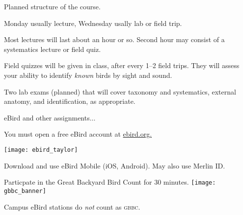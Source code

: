 \documentclass[t]{beamer}
\begin{document}
\begin{frame}[t]{Planned structure of the course.}

\vspace{-\baselineskip}

\hangpara Monday usually lecture, Wednesday usally lab or field trip.

\hangpara Most lectures will last about an hour or so. Second hour may consist of a systematics lecture or field quiz.

\hangpara Field quizzes will be given in class, after every 1–2 field trips. They will assess your ability to identify \textit{known} birds by sight and sound. 


\hangpara Two lab exams (planned) that will cover taxonomy and systematics, external anatomy, and identification, as appropriate.

\hangpara eBird and other assignments$\dots$

\end{frame}


{
\begin{frame}{You must open a free eBird account at \href{https://ebird.org}{ebird.org.}}
	\vspace{-\baselineskip}
	\begin{center}
		\texttt{[image: ebird\_taylor]}
	\end{center}
	
	Download and use eBird Mobile (iOS, Android). May also use Merlin ID.
	
%	
\end{frame}
}

\begin{frame}{Particpate in the Great Backyard Bird Count for 30 minutes.}
\texttt{[image: gbbc\_banner]}

 \hfill Campus eBird stations do \emph{not} count as \textsc{gbbc.}

\end{frame}

%
%
%
%
%
%
%
\end{document}
